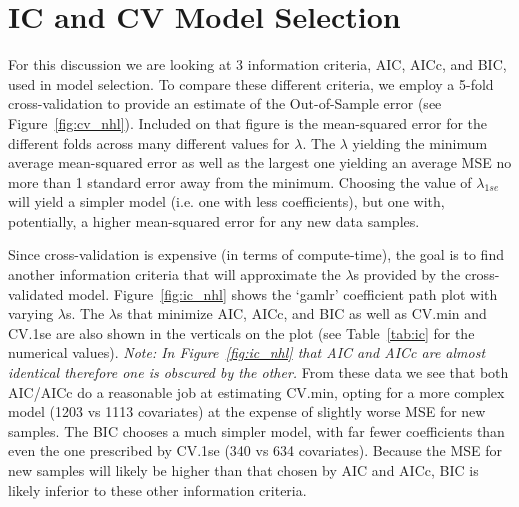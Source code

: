 \documentclass[11pt, fleqn]{article}
\begin{document}
\section{IC and CV Model Selection}
\label{sec:model}

For this discussion we are looking at 3 information criteria, AIC, AICc, and BIC, used in model selection.  To compare these different criteria, we employ a 5-fold cross-validation to provide an estimate of the Out-of-Sample error (see Figure~\vref{fig:cv_nhl}).  Included on that figure is the mean-squared error for the different folds across many different values for $\lambda$.  The $\lambda$ yielding the minimum average mean-squared error as well as the largest one yielding an average MSE no more than 1 standard error away from the minimum.  Choosing the value of $\lambda_{1se}$ will yield a simpler model (i.e. one with less coefficients), but one with, potentially, a higher mean-squared error for any new data samples.

Since cross-validation is expensive (in terms of compute-time), the goal is to find another information criteria that will approximate the $\lambda$s provided by the cross-validated model.  Figure~\ref{fig:ic_nhl} shows the `gamlr' coefficient path plot with varying $\lambda$s.  The $\lambda$s that minimize AIC, AICc, and BIC as well as CV.min and CV.1se are also shown in the verticals on the plot (see Table~\vref{tab:ic} for the numerical values).  \textit{Note: In Figure~\vref{fig:ic_nhl} that AIC and AICc are almost identical therefore one is obscured by the other.}  From these data we see that both AIC/AICc do a reasonable job at estimating CV.min, opting for a more complex model (1203 vs 1113 covariates) at the expense of slightly worse MSE for new samples.  The BIC chooses a much simpler model, with far fewer coefficients than even the one prescribed by CV.1se (340 vs 634 covariates).  Because the MSE for new samples will likely be higher than that chosen by AIC and AICc, BIC is likely inferior to these other information criteria.


\end{document}
